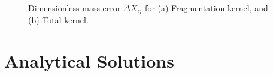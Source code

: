 

    


        \begin{figure}[h!]
            \centering
            \begin{minipage}{.5\linewidth}
                \centering
            \end{minipage}%
            \begin{minipage}{.5\linewidth}
                \centering
            \end{minipage}
            \caption{Dimensionless mass error $\Delta X_{ij}$ for
                (a) Fragmentation kernel, and
                (b) Total kernel.
            }
            \label{fig:kernel_error_for_frag_and_total}
        \end{figure}



\newpage\section{Analytical Solutions}

